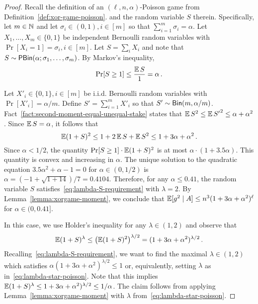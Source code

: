   \begin{proof}
    Recall the definition of an $(\ell, n, \alpha)$-Poisson game from Definition~\ref{def:xor-game-poisson}.
    and 
    the random variable $S$ therein.
    Specifically, let $m \in \mathbb{N}$ and 
    let $\sigma_i \in (0, 1), i \in [m]$ so that $\sum_{i=1}^m \sigma_i = \alpha$.
    Let $X_1, \ldots, X_m \in \{0,1\}$ be independent Bernoulli random variables with 
    $\Pr[X_i = 1] = \sigma_i, i \in [m]$. 
    Let $S = \sum_i X_i$ 
    and note that $S \sim \mathsf{PBin}(\alpha; \sigma_1, \ldots, \sigma_m)$.
    By Markov's inequality,
    $$
        \Pr[S \geq 1] \leq \frac{\operatorname{\mathbb{E}} S}{1} = \alpha \,.
    $$

    \Paragraph{Case: $\alpha \in (0, 0.41]$.}
    Let $X'_i \in \{0,1\}, i \in [m]$ be i.i.d. Bernoulli random variables 
    with $\Pr[X'_i] = \alpha/m$. 
    Define $S' = \sum_{i=1}^m X'_i$ 
    so that $S'\sim \mathsf{Bin}(m, \alpha/m)$. 
    Fact~\ref{fact:second-moment-equal-unequal-stake} states that 
    $\operatorname{\mathbb{E}} S^2 \leq \operatorname{\mathbb{E}} {S'}^2 \leq \alpha + \alpha^2$. 
    Since $\operatorname{\mathbb{E}} S = \alpha$, it follows that 
    $$
    \operatorname{\mathbb{E}} (1 + S)^2 
    \leq 1 + 2 \operatorname{\mathbb{E}} S + \operatorname{\mathbb{E}} S^2
    \leq 1 + 3 \alpha + \alpha^2
    \,.
    $$
    Since $\alpha < 1/2$, the quantity 
    $\Pr[S \geq 1] \cdot \operatorname{\mathbb{E}} (1 + S)^2$ is at most $\alpha\cdot (1 + 3.5 \alpha)$. 
    This quantity is convex and increasing in $\alpha$. 
    The unique solution to the quadratic equation $3.5 \alpha^2 + \alpha - 1 = 0$ 
    for $\alpha \in (0, 1/2)$ 
    is $\alpha = (-1 + \sqrt{1 + 14})/7 = 0.4104$. 
    Therefore, for any $\alpha \leq 0.41$, 
    the random variable $S$ satisfies~\eqref{eq:lambda-S-requirement} 
    with $\lambda = 2$.
    By Lemma~\ref{lemma:xorgame-moment}, we conclude that 
    $\operatorname{\mathbb{E}}[g^2 \mid A] \leq n^3 (1 + 3 \alpha + \alpha^2)^\ell$ 
    for $\alpha \in (0, 0.41]$.
    
    In this case, we use Holder's inequality for any $\lambda \in (1,2)$ 
    and observe that 
    $$
        \operatorname{\mathbb{E}} (1+S)^\lambda 
        \leq \left( \operatorname{\mathbb{E}} (1+S)^2 \right)^{\lambda/2} 
        = (1 + 3\alpha +\alpha^2)^{\lambda/2}
        \,.
    $$
    Recalling~\eqref{eq:lambda-S-requirement}, 
    we want to find the maximal $\lambda \in (1, 2)$ 
    which satisfies $\alpha(1 + 3\alpha +\alpha^2)^{\lambda/2} \leq 1$ or, 
    equivalently, setting $\lambda$ as in~\eqref{eq:lambda-star-poisson}. 
    Note that this implies $\operatorname{\mathbb{E}} (1+S)^\lambda \leq 1 + 3\alpha +\alpha^2)^{\lambda/2} \leq 1/\alpha$.
    The claim follows from applying Lemma~\ref{lemma:xorgame-moment} 
    with $\lambda$ from~\eqref{eq:lambda-star-poisson}. 
  \end{proof}


